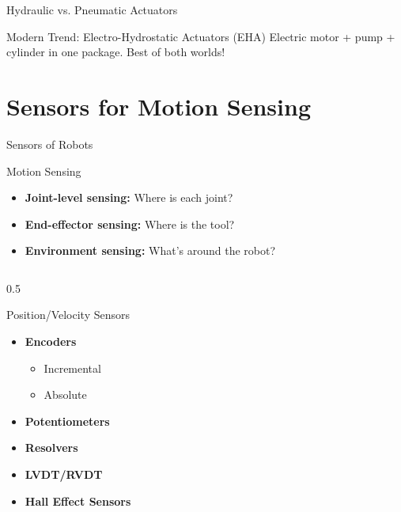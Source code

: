 \documentclass[10pt]{beamer}
\begin{document}
\begin{frame}{Hydraulic vs. Pneumatic Actuators}
    \vspace{5mm}
    \begin{alertblock}{Modern Trend: Electro-Hydrostatic Actuators (EHA)}
        Electric motor + pump + cylinder in one package. Best of both worlds!
    \end{alertblock}
\end{frame}

\section{Sensors for Motion Sensing}
\begin{frame}{Sensors of Robots}
    \begin{block}{Motion Sensing}
        \begin{itemize}
            \item \textbf{Joint-level sensing:} Where is each joint?
            \item \textbf{End-effector sensing:} Where is the tool?
            \item \textbf{Environment sensing:} What's around the robot?
        \end{itemize}
    \end{block}
    
    \begin{columns}
        \begin{column}{0.5\textwidth}
            \begin{exampleblock}{Position/Velocity Sensors}
                \begin{itemize}
                    \item \textbf{Encoders}
                    \begin{itemize}
                        \footnotesize
                        \item Incremental
                        \item Absolute
                    \end{itemize}
                    \item \textbf{Potentiometers}
                    \item \textbf{Resolvers}
                    \item \textbf{LVDT/RVDT}
                    \item \textbf{Hall Effect Sensors}
                \end{itemize}
            \end{exampleblock}
        \end{column}
        

\end{columns}
\end{frame}
\end{document}
